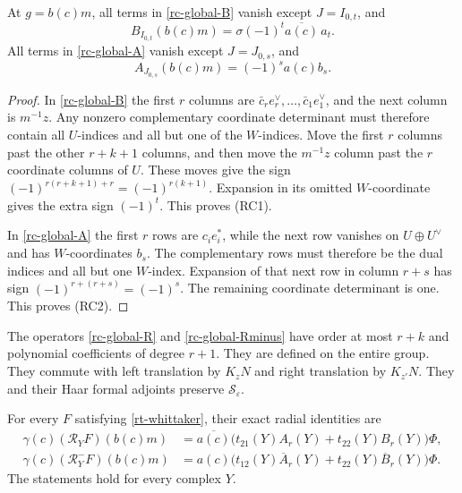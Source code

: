 \begin{lemma}\label{rc-cell-coefficients}
At $g=b(c)m$, all terms in
\eqref{rc-global-B} vanish except
$J=I_{0,t}$, and
\[
                 B_{I_{0,t}}(b(c)m)
                       =\sigma(-1)^t\overline{a(c)}\,a_t .
                                                     \tag{RC1}
\]
All terms in \eqref{rc-global-A} vanish except
$J=J_{0,s}$, and
\[
                 A_{J_{0,s}}(b(c)m)
                       =(-1)^s a(c)b_s .             \tag{RC2}
\]
\end{lemma}

\begin{proof}
In \eqref{rc-global-B} the first $r$ columns
are $\bar c_r e_r^\vee,\ldots,\bar c_1e_1^\vee$,
and the next column is $m^{-1}z$.
Any nonzero complementary coordinate determinant
must therefore contain all $U$-indices and all
but one of the $W$-indices.
Move the first $r$ columns past the other
$r+k+1$ columns, and then move the $m^{-1}z$
column past the $r$ coordinate columns of $U$.
These moves give the sign
$(-1)^{r(r+k+1)+r}=(-1)^{r(k+1)}$.
Expansion in its omitted $W$-coordinate gives
the extra sign $(-1)^t$.
This proves (RC1).

In \eqref{rc-global-A} the first $r$ rows are
$c_i e_i^*$, while the next row vanishes on
$U\oplus U^\vee$ and has $W$-coordinates $b_s$.
The complementary rows must therefore be the
dual indices and all but one $W$-index.
Expansion of that next row in column $r+s$
has sign $(-1)^{r+(r+s)}=(-1)^s$.
The remaining coordinate determinant is one.
This proves (RC2).
\end{proof}

\begin{theorem}\label{rc-actual-lifts}
The operators \eqref{rc-global-R} and
\eqref{rc-global-Rminus} have order at most
$r+k$ and polynomial coefficients of degree
$r+1$.  They are defined on the entire group.
They commute with left translation by $K_zN$
and right translation by $K_{z'}N$.
They and their Haar formal adjoints preserve
$\mathscr S_\varepsilon$.

For every $F$ satisfying \eqref{rt-whittaker},
their exact radial identities are
\begin{align}
 \gamma(c)(\mathcal R_YF)(b(c)m)
   &=\overline{a(c)}
       \bigl(t_{21}(Y)A_r(Y)+t_{22}(Y)B_r(Y)\bigr)\Phi,
                                                     \label{rc-radial-R}\\
 \gamma(c)(\mathcal R_Y^-F)(b(c)m)
   &=a(c)
       \bigl(t_{12}(Y)\overline A_r(Y)
                    +t_{22}(Y)\overline B_r(Y)\bigr)\Phi .
                                                     \label{rc-radial-Rminus}
\end{align}
The statements hold for every complex $Y$.
\end{theorem}

